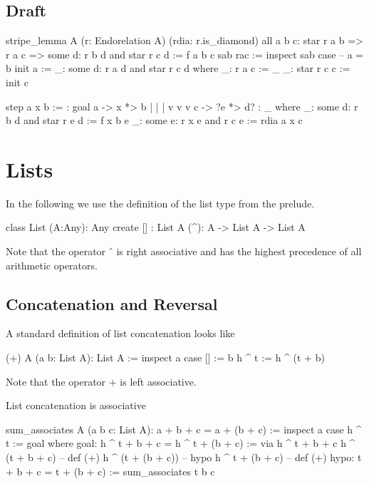 \subsection{Draft}


\begin{alba}
  stripe_lemma
    A
    (r: Endorelation A)
    (rdia: r.is_diamond)
    all a b c:
      star r a b =>
      r a c =>
      some d: r b d and star r c d :=
     f a b c sab rac :=
       inspect sab case   -- a = b
         init a :=
           _: some d: r a d and star r c d  where
             _: r a c := _
             _: star r c c := init c

         step a x b :=
           {:  goal  a  -> x  *> b
                     |     |     |
                     v     v     v
                     c  -> ?e *> d? :}
           _ where
             _: some d: r b d and star r e d := f x b e
             _: some e: r x e and r c e := rdia a x c
\end{alba}





\newpage
\section{Lists}
\label{sec:certprog-lists}


In the following we use the definition of the list type from the prelude.

\begin{alba}
  class
    List (A:Any): Any
  create
    [] : List A
    (^): A -> List A -> List A
\end{alba}
%
Note that the operator $\mathrel{\hat{\ }}$ is right associative and has the
highest precedence of all arithmetic operators.



\subsection{Concatenation and Reversal}


A standard definition of list concatenation looks like

\begin{alba}
  (+) A (a b: List A): List A :=
    inspect a case
      [] :=
        b
      h ^ t :=
        h ^ (t + b)
\end{alba}
Note that the operator $+$ is left associative.


List concatenation is associative
%
\begin{alba}
  sum_associates A (a b c: List A): a + b + c = a + (b + c) :=
    inspect a case
      h ^ t :=
        goal where
          goal: h ^ t + b + c = h ^ t + (b + c) :=
            via
               h ^ t + b + c
               h ^ (t + b + c)      -- def (+)
               h ^ (t + (b + c))    -- hypo
               h ^ t + (b + c)      -- def (+)
          hypo: t + b + c = t + (b + c) :=
            sum_associates t b c
\end{alba}


